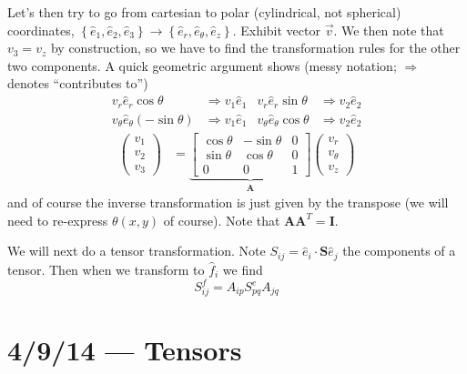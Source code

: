 \documentclass[10pt]{report}
\begin{document}
Let's then try to go from cartesian to polar (cylindrical, not spherical) coordinates, $\left\{ \hat{e}_1, \hat{e}_2, \hat{e}_3 \right\}\to \left\{ \hat{e}_r, \hat{e}_\theta, \hat{e}_z \right\}$. Exhibit vector $\vec{v}$. We then note that $v_3 = v_z$ by construction, so we have to find the transformation rules for the other two components. A quick geometric argument shows (messy notation; $\Rightarrow$ denotes ``contributes to'')
\begin{align}
    v_r\hat{e}_r\cos\theta &\Rightarrow v_1\hat{e}_1 & v_r\hat{e}_r\sin\theta &\Rightarrow v_2\hat{e}_2\\
    v_\theta\hat{e}_\theta(-\sin\theta) &\Rightarrow v_1\hat{e}_1 & v_\theta \hat{e}_\theta\cos\theta &\Rightarrow v_2\hat{e}_2
\end{align}
\begin{align}
    \begin{pmatrix} v_1\\v_2\\v_3 \end{pmatrix} &= \underbrace{\begin{bmatrix} \cos\theta  & -\sin\theta & 0\\\sin\theta & \cos\theta & 0\\0 & 0 & 1 \end{bmatrix}}_{\mathbf{A}} \begin{pmatrix} v_r\\v_\theta\\v_z \end{pmatrix} 
\end{align}
and of course the inverse transformation is just given by the transpose (we will need to re-express $\theta(x,y)$ of course). Note that $\mathbf{A}\mathbf{A}^T = \mathbf{I}$.

We will next do a tensor transformation. Note $S_{ij} = \hat{e}_i\cdot\mathbf{S}\hat{e}_j$ the components of a tensor. Then when we transform to $\hat{f}_i$ we find
\begin{equation}
    S_{ij}^f = A_{ip}S_{pq}^eA_{jq}
\end{equation}
\chapter{4/9/14 --- Tensors}
\end{document}
